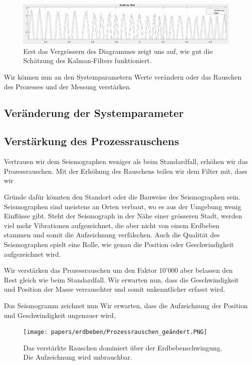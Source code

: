 \begin{figure}
	\begin{center}
		\includegraphics[width=15cm]{papers/erdbeben/Erdbeben_Standardfall_Zoom.PNG}
		\caption{Erst das Vergrössern des Diagrammes zeigt uns auf, wie gut die Schätzung des Kalman-Filters funktioniert.}
	\end{center}
\end{figure}

Wir können nun an den Systemparametern Werte verändern oder das Rauschen des Prozesses und der Messung verstärken.

\subsection{Veränderung der Systemparameter}




\subsection{Verstärkung des Prozessrauschens}
Vertrauen wir dem Seismographen weniger als beim Standardfall, erhöhen wir das Prozessrauschen.
Mit der Erhöhung des Rauschens teilen wir dem Filter mit, dass wir 

Gründe dafür könnten den Standort oder die Bauweise des Seismographen sein.
Seismographen sind meistens an Orten verbaut, wo es aus der Umgebung wenig Einflüsse gibt.
Steht der Seismograph in der Nähe einer grösseren Stadt, werden viel mehr Vibrationen aufgezeichnet, die aber nicht von einem Erdbeben stammen und somit die Aufzeichnung verfälschen.
Auch die Qualität des Seismographen spielt eine Rolle, wie genau die Position oder Geschwindigkeit aufgezeichnet wird.

Wir verstärken das Prozessrauschen um den Faktor 10'000 aber belassen den Rest gleich wie beim Standardfall.
Wir erwarten nun, dass die Geschwindigkeit und Position der Masse verrauschter und somit unkenntlicher erfasst wird.

Das Seismogramm zeichnet nun 
Wir erwarten, dass die Aufzeichnung der Position und Geschwindigkeit ungenauer wird, 

\begin{figure}
	\begin{center}
		\texttt{[image: papers/erdbeben/Prozessrauschen\_geändert.PNG]}
		\caption{Das verstärkte Rauschen dominiert über der Erdbebenschwingung. Die Aufzeichnung wird unbrauchbar.}
	\end{center}
\end{figure}

